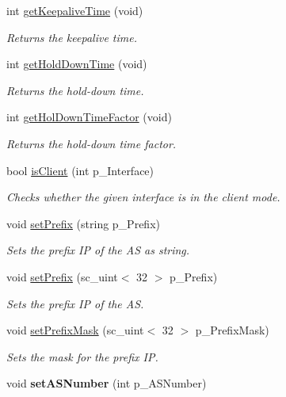 \begin{DoxyCompactItemize}
\item 
int \hyperlink{classBGPSessionParameters_ad1c71417fc4b9361f4ef49734c580418}{get\-Keepalive\-Time} (void)
\begin{DoxyCompactList}\small\item\em Returns the keepalive time. \end{DoxyCompactList}\item 
int \hyperlink{classBGPSessionParameters_ad38c18d312e65ab03f6bc3f4b659c4ce}{get\-Hold\-Down\-Time} (void)
\begin{DoxyCompactList}\small\item\em Returns the hold-\/down time. \end{DoxyCompactList}\item 
int \hyperlink{classBGPSessionParameters_a67b75e762c37bc79afe0c23d32ceec4f}{get\-Hol\-Down\-Time\-Factor} (void)
\begin{DoxyCompactList}\small\item\em Returns the hold-\/down time factor. \end{DoxyCompactList}\item 
bool \hyperlink{classBGPSessionParameters_a2681ec8adc40cc7dac2a03e7cb3d1994}{is\-Client} (int p\-\_\-\-Interface)
\begin{DoxyCompactList}\small\item\em Checks whether the given interface is in the client mode. \end{DoxyCompactList}\item 
void \hyperlink{classBGPSessionParameters_a7e04197d15b3df124836aad920ea2d1a}{set\-Prefix} (string p\-\_\-\-Prefix)
\begin{DoxyCompactList}\small\item\em Sets the prefix I\-P of the A\-S as string. \end{DoxyCompactList}\item 
void \hyperlink{classBGPSessionParameters_a943d68b6970da3a82b81d89b16fe3aeb}{set\-Prefix} (sc\-\_\-uint$<$ 32 $>$ p\-\_\-\-Prefix)
\begin{DoxyCompactList}\small\item\em Sets the prefix I\-P of the A\-S. \end{DoxyCompactList}\item 
void \hyperlink{classBGPSessionParameters_a2a7ad268d1b26c1de1cb6b793bc8a5db}{set\-Prefix\-Mask} (sc\-\_\-uint$<$ 32 $>$ p\-\_\-\-Prefix\-Mask)
\begin{DoxyCompactList}\small\item\em Sets the mask for the prefix I\-P. \end{DoxyCompactList}\item 
\hypertarget{classBGPSessionParameters_a46ce107efaa09ccdb5a226c9e52976e9}{void {\bfseries set\-A\-S\-Number} (int p\-\_\-\-A\-S\-Number)}\label{classBGPSessionParameters_a46ce107efaa09ccdb5a226c9e52976e9}


\end{DoxyCompactItemize}
